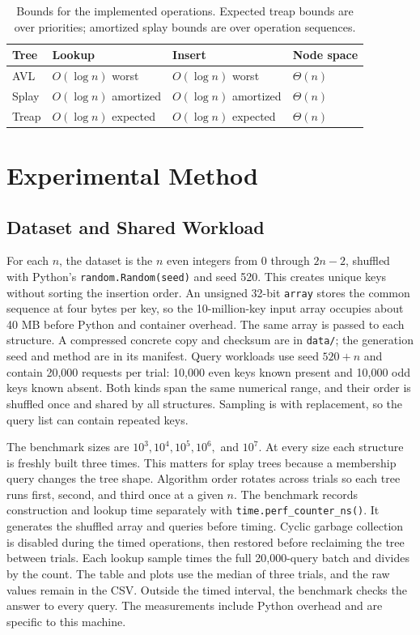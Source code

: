 \documentclass[acmsmall,nonacm]{acmart}
\begin{document}
\begin{table}[t]
\caption{Bounds for the implemented operations. Expected treap bounds are over priorities; amortized splay bounds are over operation sequences.}
\label{tab:bounds}
\centering\small
\begin{tabular}{@{}llll@{}}
\toprule
Tree & Lookup & Insert & Node space \\
\midrule
AVL & $O(\log n)$ worst & $O(\log n)$ worst & $\Theta(n)$ \\
Splay & $O(\log n)$ amortized & $O(\log n)$ amortized & $\Theta(n)$ \\
Treap & $O(\log n)$ expected & $O(\log n)$ expected & $\Theta(n)$ \\
\bottomrule
\end{tabular}
\end{table}

\section{Experimental Method}
\subsection{Dataset and Shared Workload}
For each $n$, the dataset is the $n$ even integers from $0$ through $2n-2$, shuffled with Python's \texttt{random.Random(seed)} and seed 520. This creates unique keys without sorting the insertion order. An unsigned 32-bit \texttt{array} stores the common sequence at four bytes per key, so the 10-million-key input array occupies about 40 MB before Python and container overhead. The same array is passed to each structure. A compressed concrete copy and checksum are in \texttt{data/}; the generation seed and method are in its manifest. Query workloads use seed $520+n$ and contain 20,000 requests per trial: 10,000 even keys known present and 10,000 odd keys known absent. Both kinds span the same numerical range, and their order is shuffled once and shared by all structures. Sampling is with replacement, so the query list can contain repeated keys.

The benchmark sizes are $10^3,10^4,10^5,10^6,$ and $10^7$. At every size each structure is freshly built three times. This matters for splay trees because a membership query changes the tree shape. Algorithm order rotates across trials so each tree runs first, second, and third once at a given $n$. The benchmark records construction and lookup time separately with \texttt{time.perf\_counter\_ns()}. It generates the shuffled array and queries before timing. Cyclic garbage collection is disabled during the timed operations, then restored before reclaiming the tree between trials. Each lookup sample times the full 20,000-query batch and divides by the count. The table and plots use the median of three trials, and the raw values remain in the CSV. Outside the timed interval, the benchmark checks the answer to every query. The measurements include Python overhead and are specific to this machine.
\end{document}

